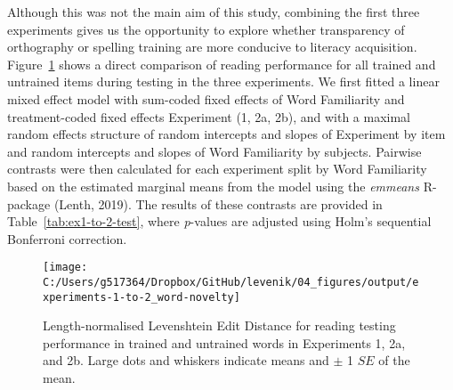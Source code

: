 \documentclass[doc,floatsintext]{apa6}
\begin{document}
Although this was not the main aim of this study, combining the first
three experiments gives us the opportunity to explore whether
transparency of orthography or spelling training are more conducive to
literacy acquisition. Figure~\ref{fig:ex1-to-2-test-plots} shows a
direct comparison of reading performance for all trained and untrained
items during testing in the three experiments. We first fitted a linear
mixed effect model with sum-coded fixed effects of Word Familiarity and
treatment-coded fixed effects Experiment (1, 2a, 2b), and with a maximal
random effects structure of random intercepts and slopes of Experiment
by item and random intercepts and slopes of Word Familiarity by
subjects. Pairwise contrasts were then calculated for each experiment
split by Word Familiarity based on the estimated marginal means from the
model using the \emph{emmeans} R-package (Lenth, 2019). The results of
these contrasts are provided in Table~\ref{tab:ex1-to-2-test}, where
\emph{p}-values are adjusted using Holm's sequential Bonferroni
correction.

\begin{figure}[H]

{\centering \texttt{[image: C:/Users/g517364/Dropbox/GitHub/levenik/04\_figures/output/experiments-1-to-2\_word-novelty]} 

}

\caption{Length-normalised Levenshtein Edit Distance for reading testing performance in trained and untrained words in Experiments 1, 2a, and 2b. Large dots and whiskers indicate means and $\pm$ 1 $SE$ of the mean.}\label{fig:ex1-to-2-test-plots}
\end{figure}
\end{document}
